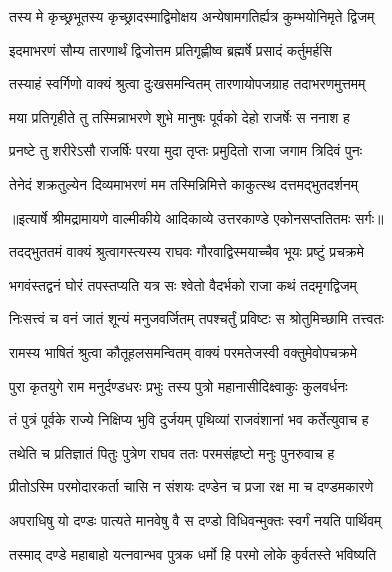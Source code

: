 \twolineshloka
{तस्य मे कृच्छ्रभूतस्य कृच्छ्रादस्माद्विमोक्षय}
{अन्येषामगतिर्ह्यत्र कुम्भयोनिमृते द्विजम्} %

\twolineshloka
{इदमाभरणं सौम्य तारणार्थं द्विजोत्तम}
{प्रतिगृह्णीष्व ब्रह्मर्षे प्रसादं कर्तुमर्हसि} %

\twolineshloka
{तस्याहं स्वर्गिणो वाक्यं श्रुत्वा दुःखसमन्वितम्}
{तारणायोपजग्राह तदाभरणमुत्तमम्} %

\twolineshloka
{मया प्रतिगृहीते तु तस्मिन्नाभरणे शुभे}
{मानुषः पूर्वको देहो राजर्षेः स ननाश ह} %

\twolineshloka
{प्रनष्टे तु शरीरेऽसौ राजर्षिः परया मुदा}
{तृप्तः प्रमुदितो राजा जगाम त्रिदिवं पुनः} %

\twolineshloka
{तेनेदं शक्रतुल्येन दिव्यमाभरणं मम}
{तस्मिन्निमित्ते काकुत्स्थ दत्तमद्भुतदर्शनम्} %


{॥इत्यार्षे श्रीमद्रामायणे वाल्मीकीये आदिकाव्ये उत्तरकाण्डे एकोनसप्ततितमः सर्गः॥}


\twolineshloka
{तदद्भुततमं वाक्यं श्रुत्वागस्त्यस्य राघवः}
{गौरवाद्विस्मयाच्चैव भूयः प्रष्टुं प्रचक्रमे} %

\twolineshloka
{भगवंस्तद्वनं घोरं तपस्तप्यति यत्र सः}
{श्वेतो वैदर्भको राजा कथं तदमृगद्विजम्} %

\twolineshloka
{निःसत्त्वं च वनं जातं शून्यं मनुजवर्जितम्}
{तपश्चर्तुं प्रविष्टः स श्रोतुमिच्छामि तत्त्वतः} %

\twolineshloka
{रामस्य भाषितं श्रुत्वा कौतूहलसमन्वितम्}
{वाक्यं परमतेजस्वी वक्तुमेवोपचक्रमे} %

\twolineshloka
{पुरा कृतयुगे राम मनुर्दण्डधरः प्रभुः}
{तस्य पुत्रो महानासीदिक्ष्वाकुः कुलवर्धनः} %

\twolineshloka
{तं पुत्रं पूर्वके राज्ये निक्षिप्य भुवि दुर्जयम्}
{पृथिव्यां राजवंशानां भव कर्तेत्युवाच ह} %

\twolineshloka
{तथेति च प्रतिज्ञातं पितुः पुत्रेण राघव}
{ततः परमसंहृष्टो मनुः पुनरुवाच ह} %

\twolineshloka
{प्रीतोऽस्मि परमोदारकर्ता चासि न संशयः}
{दण्डेन च प्रजा रक्ष मा च दण्डमकारणे} %

\twolineshloka
{अपराधिषु यो दण्डः पात्यते मानवेषु वै}
{स दण्डो विधिवन्मुक्तः स्वर्गं नयति पार्थिवम्} %

\twolineshloka
{तस्माद् दण्डे महाबाहो यत्नवान्भव पुत्रक}
{धर्मो हि परमो लोके कुर्वतस्ते भविष्यति} %

